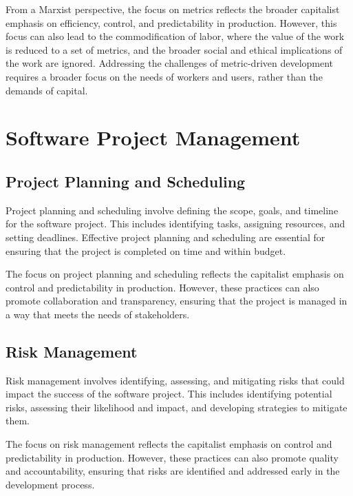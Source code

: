 \begin{refsection}
\begin{multicols}{2}
{From a Marxist perspective, the focus on metrics reflects the broader capitalist emphasis on efficiency, control, and predictability in production. However, this focus can also lead to the commodification of labor, where the value of the work is reduced to a set of metrics, and the broader social and ethical implications of the work are ignored. Addressing the challenges of metric-driven development requires a broader focus on the needs of workers and users, rather than the demands of capital.

}
\end{multicols}
\newpage

\section{Software Project Management}
\begin{multicols}{2}
{\small

\subsection{Project Planning and Scheduling}

Project planning and scheduling involve defining the scope, goals, and timeline for the software project. This includes identifying tasks, assigning resources, and setting deadlines. Effective project planning and scheduling are essential for ensuring that the project is completed on time and within budget.

The focus on project planning and scheduling reflects the capitalist emphasis on control and predictability in production. However, these practices can also promote collaboration and transparency, ensuring that the project is managed in a way that meets the needs of stakeholders.

\subsection{Risk Management}

Risk management involves identifying, assessing, and mitigating risks that could impact the success of the software project. This includes identifying potential risks, assessing their likelihood and impact, and developing strategies to mitigate them.

The focus on risk management reflects the capitalist emphasis on control and predictability in production. However, these practices can also promote quality and accountability, ensuring that risks are identified and addressed early in the development process.

}
\end{multicols}
\end{refsection}

